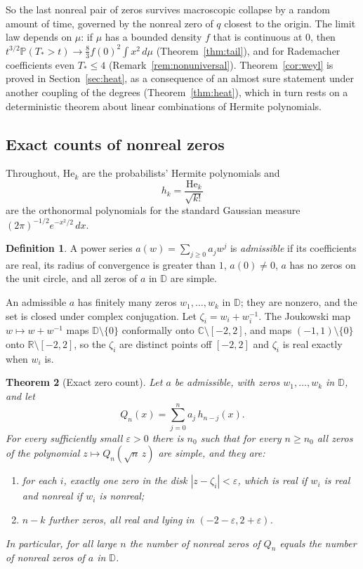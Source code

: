 \documentclass[11pt]{amsart}
\newtheorem{theorem}{Theorem}[section]
\theoremstyle{definition}
\newtheorem{definition}[theorem]{Definition}
\theoremstyle{remark}
\numberwithin{equation}{section}
\newcommand{\C}{\mathbb{C}}
\newcommand{\R}{\mathbb{R}}
\newcommand{\D}{\mathbb{D}}
\newcommand{\PP}{\mathbb{P}}
\newcommand{\eps}{\varepsilon}
\newcommand{\He}{\mathrm{He}}
\begin{document}
So the last nonreal pair of zeros survives macroscopic collapse by a random amount of time, governed by the nonreal zero of $q$ closest to the origin. The limit law depends on $\mu$: if $\mu$ has a bounded density $f$ that is continuous at $0$, then $t^{3/2}\PP(T_*>t)\to\frac83f(0)^2\int x^2\,d\mu$ (Theorem~\ref{thm:tail}), and for Rademacher coefficients even $T_*\le4$ (Remark~\ref{rem:nonuniversal}). Theorem~\ref{cor:weyl} is proved in Section~\ref{sec:heat}, as a consequence of an almost sure statement under another coupling of the degrees (Theorem~\ref{thm:heat}), which in turn rests on a deterministic theorem about linear combinations of Hermite polynomials.

\subsection{Exact counts of nonreal zeros}\label{sec:intro-count}
Throughout, $\He_k$ are the probabilists' Hermite polynomials and
\[
h_k=\frac{\He_k}{\sqrt{k!}}
\]
are the orthonormal polynomials for the standard Gaussian measure $(2\pi)^{-1/2}e^{-x^2/2}\,dx$.

\begin{definition}\label{def:admissible}
A power series $a(w)=\sum_{j\ge0}a_jw^j$ is \emph{admissible} if its coefficients are real, its radius of convergence is greater than $1$, $a(0)\neq0$, $a$ has no zeros on the unit circle, and all zeros of $a$ in $\D$ are simple.
\end{definition}

An admissible $a$ has finitely many zeros $w_1,\dots,w_k$ in $\D$; they are nonzero, and the set is closed under complex conjugation. Let $\zeta_i=w_i+w_i^{-1}$. The Joukowski map $w\mapsto w+w^{-1}$ maps $\D\setminus\{0\}$ conformally onto $\C\setminus[-2,2]$, and maps $(-1,1)\setminus\{0\}$ onto $\R\setminus[-2,2]$, so the $\zeta_i$ are distinct points off $[-2,2]$ and $\zeta_i$ is real exactly when $w_i$ is.

\begin{theorem}[Exact zero count]\label{thm:main}
Let $a$ be admissible, with zeros $w_1,\dots,w_k$ in $\D$, and let
\[
Q_n(x)=\sum_{j=0}^{n}a_j\,h_{n-j}(x).
\]
For every sufficiently small $\eps>0$ there is $n_0$ such that for every $n\ge n_0$ all zeros of the polynomial $z\mapsto Q_n(\sqrt n\,z)$ are simple, and they are:
\begin{enumerate}
\item[(a)] for each $i$, exactly one zero in the disk $|z-\zeta_i|<\eps$, which is real if $w_i$ is real and nonreal if $w_i$ is nonreal;
\item[(b)] $n-k$ further zeros, all real and lying in $(-2-\eps,2+\eps)$.
\end{enumerate}
In particular, for all large $n$ the number of nonreal zeros of $Q_n$ equals the number of nonreal zeros of $a$ in $\D$.
\end{theorem}
\end{document}
